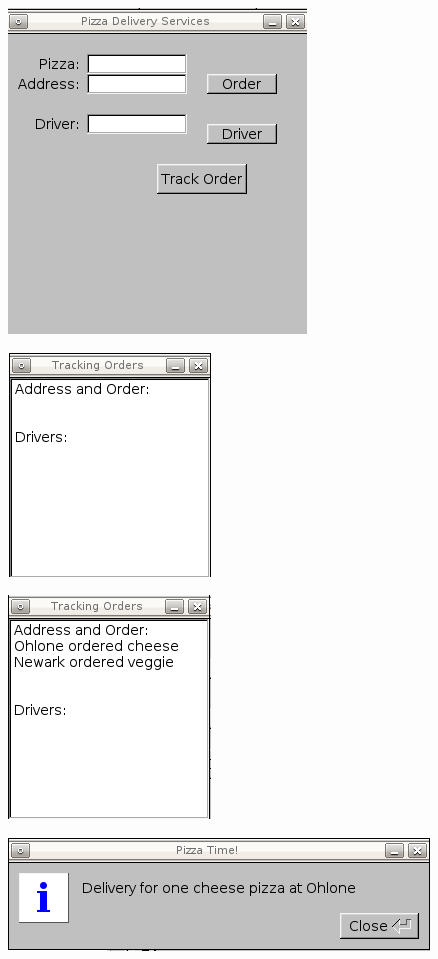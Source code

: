  
\includegraphics{../GUI.png}


\includegraphics{../emptyQ.png}


\includegraphics{../pizza.png}


\includegraphics{../delivery.png}


